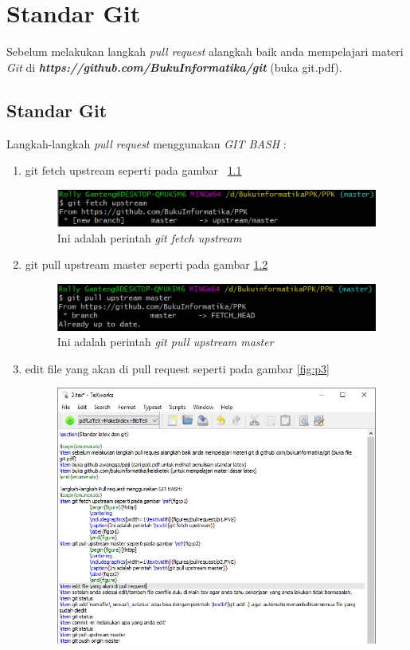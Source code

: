 \chapter{Standar Git}
Sebelum melakukan langkah \textit{pull request} alangkah baik anda mempelajari materi \textit{Git} di \textbf{\textit{https://github.com/BukuInformatika/git}} (buka git.pdf).

\section{Standar Git}
Langkah-langkah \textit{pull request} menggunakan \textit{GIT BASH} :
\begin{enumerate}
\item git fetch upstream seperti pada gambar ~\ref{fig:p1}
		\begin{figure}[H]
		\centering
		\includegraphics[width=1\textwidth]{figures/pullrequest/p1.PNG}
		\caption{Ini adalah perintah \textit{git fetch upstream}}
		\label{fig:p1}
		\end{figure}
\item git pull upstream master seperti pada gambar \ref{fig:p2}
		\begin{figure}[H]
		\centering
		\includegraphics[width=1\textwidth]{figures/pullrequest/p2.PNG}
		\caption{Ini adalah perintah \textit{git pull upstream master}}
		\label{fig:p2}
		\end{figure}
\item edit file yang akan di pull request seperti pada gambar \ref{fig:p3}
		\begin{figure}[H]
		\centering
		\includegraphics[width=1\textwidth]{figures/pullrequest/p3.PNG}

\end{figure}
\end{enumerate}
